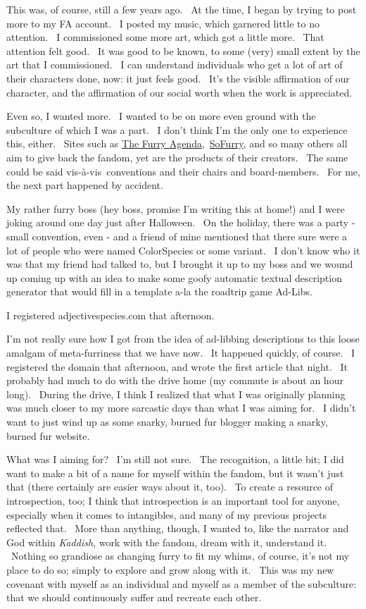 This was, of course, still a few years ago. ~At the time, I began by
trying to post more to my FA account. ~I posted my music, which garnered
little to no attention. ~I commissioned some more art, which got a
little more. ~That attention felt good. ~It was good to be known, to
some (very) small extent by the art that I commissioned. ~I can
understand individuals who get a lot of art of their characters done,
now: it just feels good. ~It's the visible affirmation of our character,
and the affirmation of our social worth when the work is appreciated.

Even so, I wanted more. ~I wanted to be on more even ground with the
subculture of which I was a part. ~I don't think I'm the only one to
experience this, either. ~Sites such as
\href{http://furryagenda.com}{The Furry
Agenda},~\href{http://sofurry.com}{SoFurry}, and so many others all aim
to give back the fandom, yet are the products of their creators. ~The
same could be said vis-à-vis~conventions and their chairs and
board-members.~ For me, the next part happened by accident.

My rather furry boss (hey boss, promise I'm writing this at home!) and I
were joking around one day just after Halloween. ~On the holiday, there
was a party - small convention, even - and a friend of mine mentioned
that there sure were a lot of people who were named ColorSpecies or some
variant. ~I don't know who it was that my friend had talked to, but I
brought it up to my boss and we wound up coming up with an idea to make
some goofy automatic textual description generator that would fill in a
template a-la the roadtrip game Ad-Libs.

I registered adjectivespecies.com that afternoon.

I'm not really sure how I got from the idea of ad-libbing descriptions
to this loose amalgam of meta-furriness that we have now. ~It happened
quickly, of course. ~I registered the domain that afternoon, and wrote
the first article that night. ~It probably had much to do with the drive
home (my commute is about an hour long). ~During the drive, I think I
realized that what I was originally planning was much closer to my more
sarcastic days than what I was aiming for. ~I didn't want to just wind
up as some snarky, burned fur blogger making a snarky, burned fur
website.

What was I aiming for? ~I'm still not sure. ~The recognition, a little
bit; I did want to make a bit of a name for myself within the fandom,
but it wasn't just that (there certainly are easier ways about it, too).
~To create a resource of introspection, too; I think that introspection
is an important tool for anyone, especially when it comes to
intangibles, and many of my previous projects reflected that. ~More than
anything, though, I wanted to, like the narrator and God within
\emph{Kaddish}, work with the fandom, dream with it, understand it.
~Nothing so grandiose as changing furry to fit my whims, of course, it's
not my place to do so; simply to explore and grow along with it. ~This
was my new covenant with myself as an individual and myself as a member
of the subculture: that we should continuously suffer and recreate each
other.
